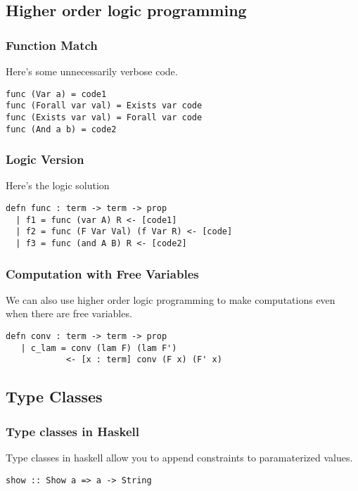 \subsection[HOLP]{Higher order logic programming}

\begin{frame}[fragile]
\frametitle{Function Match}

Here's some unnecessarily verbose code.

\begin{lstlisting}
func (Var a) = code1
func (Forall var val) = Exists var code
func (Exists var val) = Forall var code
func (And a b) = code2
\end{lstlisting}
\end{frame}


\begin{frame}[fragile]
\frametitle{Logic Version}

Here's the logic solution

\begin{lstlisting}
defn func : term -> term -> prop 
  | f1 = func (var A) R <- [code1]
  | f2 = func (F Var Val) (f Var R) <- [code]
  | f3 = func (and A B) R <- [code2]
\end{lstlisting}
\end{frame}


\begin{frame}[fragile]
\frametitle{Computation with Free Variables}

We can also use higher order logic programming to make computations even when 
there are free variables.

\begin{lstlisting}
defn conv : term -> term -> prop
   | c_lam = conv (lam F) (lam F') 
            <- [x : term] conv (F x) (F' x)
\end{lstlisting}
\end{frame}

\subsection{Type Classes}

\begin{frame}[fragile]
\frametitle{Type classes in Haskell}

Type classes in haskell allow you to append constraints
to paramaterized values.

\begin{lstlisting}
show :: Show a => a -> String
\end{lstlisting}
\end{frame}


